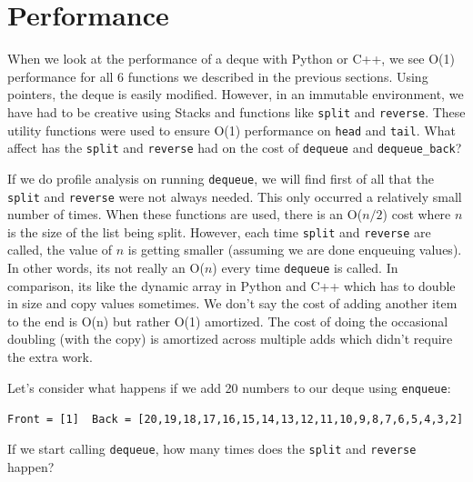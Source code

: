 \documentclass[
]{book}
\begin{document}
\hypertarget{performance-3}{%
\section{Performance}\label{performance-3}}

When we look at the performance of a deque with Python or C++, we see O(1) performance for all 6 functions we described in the previous sections. Using pointers, the deque is easily modified. However, in an immutable environment, we have had to be creative using Stacks and functions like \texttt{split} and \texttt{reverse}. These utility functions were used to ensure O(1) performance on \texttt{head} and \texttt{tail}. What affect has the \texttt{split} and \texttt{reverse} had on the cost of \texttt{dequeue} and \texttt{dequeue\_back}?

If we do profile analysis on running \texttt{dequeue}, we will find first of all that the \texttt{split} and \texttt{reverse} were not always needed. This only occurred a relatively small number of times. When these functions are used, there is an O(\(n/2\)) cost where \(n\) is the size of the list being split. However, each time \texttt{split} and \texttt{reverse} are called, the value of \(n\) is getting smaller (assuming we are done enqueuing values). In other words, its not really an O(\(n\)) every time \texttt{dequeue} is called. In comparison, its like the dynamic array in Python and C++ which has to double in size and copy values sometimes. We don't say the cost of adding another item to the end is O(n) but rather O(1) amortized. The cost of doing the occasional doubling (with the copy) is amortized across multiple adds which didn't require the extra work.

Let's consider what happens if we add 20 numbers to our deque using \texttt{enqueue}:

\texttt{Front\ =\ {[}1{]}\ \ Back\ =\ {[}20,19,18,17,16,15,14,13,12,11,10,9,8,7,6,5,4,3,2{]}}

If we start calling \texttt{dequeue}, how many times does the \texttt{split} and \texttt{reverse} happen?
\end{document}
